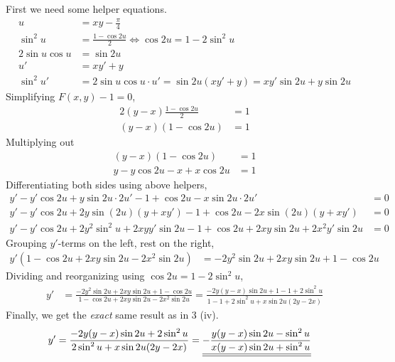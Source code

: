 First we need some helper equations.
\begin{align*}
  u &= xy-\frac{\pi}{4} \\
  \sin^2{u} &= \frac{1-\cos{2u}}{2}
      \iff \cos{2u} = 1 - 2\sin^2{u} \\
  2\sin{u}\cos{u} &= \sin{2u} \\
  u' &= xy' + y \\
  \sin^2{u}' &= 2\sin{u}\cos{u}\cdot u' = \sin{2u}(xy'+y) =
      xy'\sin{2u}+y\sin{2u}
\end{align*}
Simplifying $F(x,y)-1 = 0$,
\begin{align*}
  2(y-x)\frac{1-\cos{2u}}{2} &= 1 \\
  (y-x)(1-\cos{2u}) &= 1
\end{align*}
Multiplying out
\begin{align*}
  (y-x)(1-\cos{2u}) &= 1 \\
  y - y\cos{2u} -x + x\cos{2u} &= 1
\end{align*}
Differentiating both sides using above helpers,
\begin{align*}
  y' - y'\cos{2u} + y\sin{2u}\cdot 2u' - 1 + \cos{2u} - x\sin{2u}\cdot 2u' &= 0 \\
  y' - y'\cos{2u} + 2y\sin{(2u)}(y+xy') - 1 + \cos{2u} - 2x\sin{(2u)}(y+xy') &= 0 \\
  y' - y'\cos{2u} + 2y^2\sin^2{u} + 2xyy'\sin{2u} - 1 + \cos{2u}
    +2xy\sin{2u} + 2x^2y'\sin{2u} &= 0
\end{align*}
Grouping $y'$-terms on the left, rest on the right,
\begin{align*}
  y'\left( 1 - \cos{2u} + 2xy\sin{2u} - 2x^2\sin{2u} \right)
    &= -2y^2\sin{2u} + 2xy\sin{2u} + 1 - \cos{2u}
\end{align*}
Dividing and reorganizing using $\cos{2u} = 1 - 2\sin^2{u}$,
\begin{align*}
  y' &= \frac{-2y^2\sin{2u} + 2xy\sin{2u} + 1 - \cos{2u}}
             {1 - \cos{2u} + 2xy\sin{2u} - 2x^2\sin{2u}}
      = \frac{-2y(y-x)\sin{2u} + 1 - 1 + 2\sin^2{u}}
             {1 - 1 + 2\sin^2{u} + x\sin{2u}(2y-2x)}
\end{align*}
Finally, we get the \textit{exact} same result as in 3 (iv).
\begin{align*}
  y' &= \frac{-2y(y-x)\sin{2u} + 2\sin^2{u}}
             {2\sin^2{u} + x\sin{2u}(2y-2x)}
      = {\underline{\underline{-\frac{y(y-x)\sin{2u} - \sin^2{u}}
                    {x(y-x)\sin{2u} + \sin^2{u}}}}}
\end{align*}
